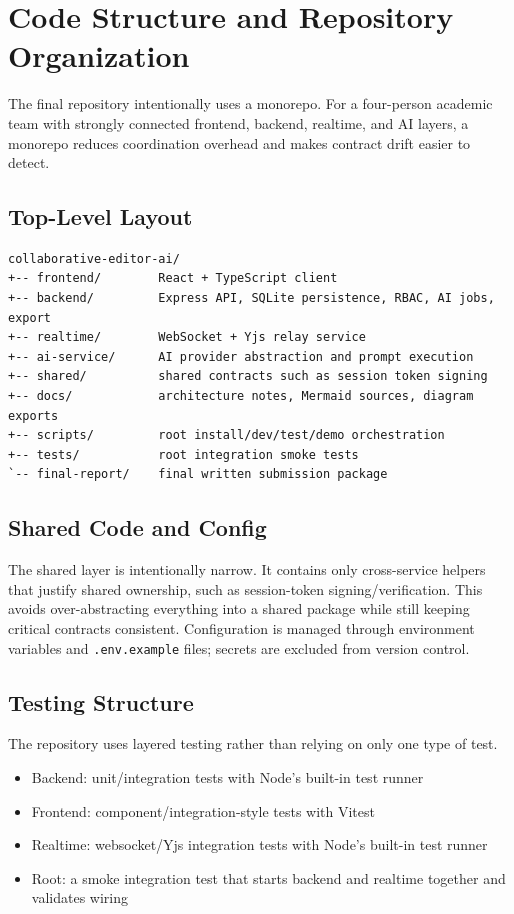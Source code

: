 \section{Code Structure and Repository Organization}

The final repository intentionally uses a monorepo. For a four-person academic team with strongly
connected frontend, backend, realtime, and AI layers, a monorepo reduces coordination overhead and makes
contract drift easier to detect.

\subsection{Top-Level Layout}

\begin{lstlisting}[basicstyle=\ttfamily\small]
collaborative-editor-ai/
+-- frontend/        React + TypeScript client
+-- backend/         Express API, SQLite persistence, RBAC, AI jobs, export
+-- realtime/        WebSocket + Yjs relay service
+-- ai-service/      AI provider abstraction and prompt execution
+-- shared/          shared contracts such as session token signing
+-- docs/            architecture notes, Mermaid sources, diagram exports
+-- scripts/         root install/dev/test/demo orchestration
+-- tests/           root integration smoke tests
`-- final-report/    final written submission package
\end{lstlisting}

\subsection{Shared Code and Config}

The shared layer is intentionally narrow. It contains only cross-service helpers that justify shared
ownership, such as session-token signing/verification. This avoids over-abstracting everything into a
shared package while still keeping critical contracts consistent. Configuration is managed through
environment variables and \texttt{.env.example} files; secrets are excluded from version control.

\subsection{Testing Structure}

The repository uses layered testing rather than relying on only one type of test.

\begin{itemize}
  \item Backend: unit/integration tests with Node's built-in test runner
  \item Frontend: component/integration-style tests with Vitest
  \item Realtime: websocket/Yjs integration tests with Node's built-in test runner
  \item Root: a smoke integration test that starts backend and realtime together and validates wiring
\end{itemize}

